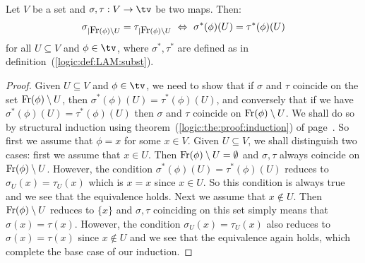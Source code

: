 \begin{prop}\label{logic:prop:LAM:freevar:beta:support}
    Let $V$ be a set and $\sigma,\tau:V\to\tv$ be two maps. Then:
        \[
            \sigma_{|\free(\phi)\setminus U}=\tau_{|\free(\phi)\setminus U}
            \ \Leftrightarrow\ \sigma^{*}(\phi)(U)=\tau^{*}(\phi)(U)
        \]
    for all $U\subseteq V$ and $\phi\in\tv$, where $\sigma^{*},\tau^{*}$ are 
    defined as in definition~(\ref{logic:def:LAM:subst}).
\end{prop}
\begin{proof}
    Given $U\subseteq V$ and $\phi\in\tv$, we need to show that if $\sigma$
    and $\tau$ coincide on the set $\mbox{\rm Fr}(\phi)\setminus U$, then 
    $\sigma^{*}(\phi)(U)=\tau^{*}(\phi)(U)$, and conversely that if 
    we have $\sigma^{*}(\phi)(U)=\tau^{*}(\phi)(U)$ then $\sigma$ and $\tau$ 
    coincide on $\mbox{\rm Fr}(\phi)\setminus U$. We shall do so by structural
    induction using theorem~(\ref{logic:the:proof:induction}) of
    page~\pageref{logic:the:proof:induction}. So first we assume that 
    $\phi=x$ for some $x\in V$. Given $U\subseteq V$, we shall distinguish 
    two cases: first we assume that $x\in U$. Then $\mbox{\rm Fr}(\phi)\setminus U=
    \emptyset$ and $\sigma, \tau$ always coincide on $\mbox{\rm Fr}(\phi)\setminus U$.
    However, the condition $\sigma^{*}(\phi)(U)=\tau^{*}(\phi)(U)$ reduces
    to $\sigma_{U}(x)=\tau_{U}(x)$ which is $x = x$ since $x\in U$. So this
    condition is always true and we see that the equivalence holds. Next
    we assume that $x\not\in U$. Then $\mbox{\rm Fr}(\phi)\setminus U$ reduces to 
    $\{x\}$ and $\sigma,\tau$ coinciding on this set simply means that 
    $\sigma(x) = \tau(x)$. However, the condition $\sigma_{U}(x)=\tau_{U}(x)$
    also reduces to $\sigma(x)=\tau(x)$ since $x\not\in U$ and we see that 
    the equivalence again holds, which complete the base case of our 
    induction.


\end{proof}
